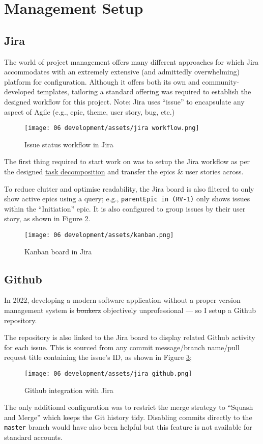 \section{Management Setup}

\subsection{Jira}
The world of project management offers many different
approaches for which Jira accommodates with an extremely
extensive (and admittedly overwhelming) platform for
configuration.
Although it offers both its own and community-developed
templates, tailoring a standard offering was required to
establish the designed workflow for this project.
Note: Jira uses \enquote{issue} to encapsulate any aspect
of Agile (e.g., epic, theme, user story, bug, etc.)

\begin{figure}[h]
  \centering
  \texttt{[image: 06
    development/assets/jira workflow.png]}
  \caption{Issue status workflow in Jira}
  \label{fig:workflow}
\end{figure}

The first thing required to start work on \projectname{}
was to setup the Jira workflow as per the designed
\hyperref[p:decomp]{task decomposition} and transfer the
epics \& user stories across.

To reduce clutter and optimise readability, the Jira board
is also filtered to only show active epics using a query;
e.g., \lstinline{parentEpic in (RV-1)} only shows issues
within the \enquote{Initiation} epic.
It is also configured to group issues by their user story,
as shown in Figure \ref{fig:kanban}.

\begin{figure}[h]
  \centering
  \texttt{[image: 06
    development/assets/kanban.png]}
  \caption{Kanban board in Jira}
  \label{fig:kanban}
\end{figure}

\subsection{Github}
In 2022, developing a modern software application without a
proper version management system is
\sout{bonkerz} objectively unprofessional --- so I setup a
Github repository. 

The repository is also linked to the Jira board to display
related Github activity for each issue. This is sourced from 
any commit message/branch name/pull request title
containing the issue's ID, as shown in Figure
\ref{fig:jiraGithub};

\begin{figure}[h]
  \centering
  \texttt{[image: 06
    development/assets/jira github.png]}
  \caption{Github integration with Jira}
  \label{fig:jiraGithub}
\end{figure}

The only additional configuration was to restrict the merge
strategy to \enquote{Squash and Merge} which keeps the Git
history tidy. Disabling commits directly to the
\lstinline{master} branch would have also been helpful but
this feature is not available for standard accounts.